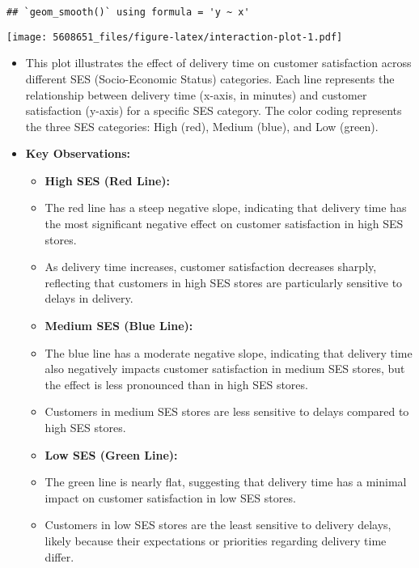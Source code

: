 \documentclass[
]{article}
\begin{document}
\begin{verbatim}
## `geom_smooth()` using formula = 'y ~ x'
\end{verbatim}

\texttt{[image: 5608651\_files/figure-latex/interaction-plot-1.pdf]}

\begin{itemize}
\item
  This plot illustrates the effect of delivery time on customer
  satisfaction across different SES (Socio-Economic Status) categories.
  Each line represents the relationship between delivery time (x-axis,
  in minutes) and customer satisfaction (y-axis) for a specific SES
  category. The color coding represents the three SES categories: High
  (red), Medium (blue), and Low (green).
\item
  \textbf{Key Observations:}

  \begin{itemize}
  \item
    \textbf{High SES (Red Line):}
  \item
    The red line has a steep negative slope, indicating that delivery
    time has the most significant negative effect on customer
    satisfaction in high SES stores.
  \item
    As delivery time increases, customer satisfaction decreases sharply,
    reflecting that customers in high SES stores are particularly
    sensitive to delays in delivery.
  \item
    \textbf{Medium SES (Blue Line):}
  \item
    The blue line has a moderate negative slope, indicating that
    delivery time also negatively impacts customer satisfaction in
    medium SES stores, but the effect is less pronounced than in high
    SES stores.
  \item
    Customers in medium SES stores are less sensitive to delays compared
    to high SES stores.
  \item
    \textbf{Low SES (Green Line):}
  \item
    The green line is nearly flat, suggesting that delivery time has a
    minimal impact on customer satisfaction in low SES stores.
  \item
    Customers in low SES stores are the least sensitive to delivery
    delays, likely because their expectations or priorities regarding
    delivery time differ.
  \end{itemize}
\end{itemize}
\end{document}
